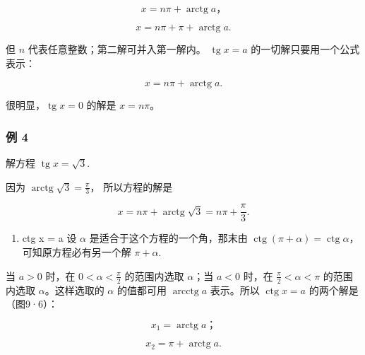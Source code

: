 \[
x = n \pi + \operatorname{arctg} a\text{，}
\]

\[
x = n \pi + \pi + \operatorname{arctg} a.
\]

但 \(n\) 代表任意整数；第二解可并入第一解内。
\(\operatorname{tg} x = a\) 的一切解只要用一个公式表示：

\[
\boxed {x = n \pi + \operatorname{arctg} a.}
\]

很明显，\(\operatorname{tg} x = 0\) 的解是 \(x = n\pi\)。

\subsubsection{例 4}

解方程 \(\operatorname{tg} x = \sqrt{3}\).

 因为 \(\operatorname{arctg} \sqrt{3} = \frac{\pi}{3}\)，
所以方程的解是

\[
x = n \pi + \operatorname{arctg} \sqrt {3} = n\pi+\frac{\pi}{3}.
\]

\begin{enumerate}[start=4]
\item
  ctg x = a 设 \(\alpha\) 是适合于这个方程的一个角，那末由
  \(\operatorname{ctg}(\pi + \alpha) = \operatorname{ctg} \alpha\)，可知原方程必有另一个解
  \(\pi + \alpha\).
\end{enumerate}

当 \(a > 0\) 时，在 \(0 < \alpha < \frac{\pi}{2}\) 的范围内选取
\(\alpha\)；当 \(a < 0\) 时，在 \(\frac{\pi}{2} < \alpha < \pi\)
的范围内选取 \(\alpha\)。这样选取的 \(\alpha\) 的值都可用
\(\operatorname{arcctg}a\) 表示。所以 \(\operatorname{ctg} x = a\)
的两个解是（图9·6）：

\[
x _ {1} = \operatorname{arctg} a\text{；}
\]

\[
x _ {2} = \pi + \operatorname{arctg} a.
\]

